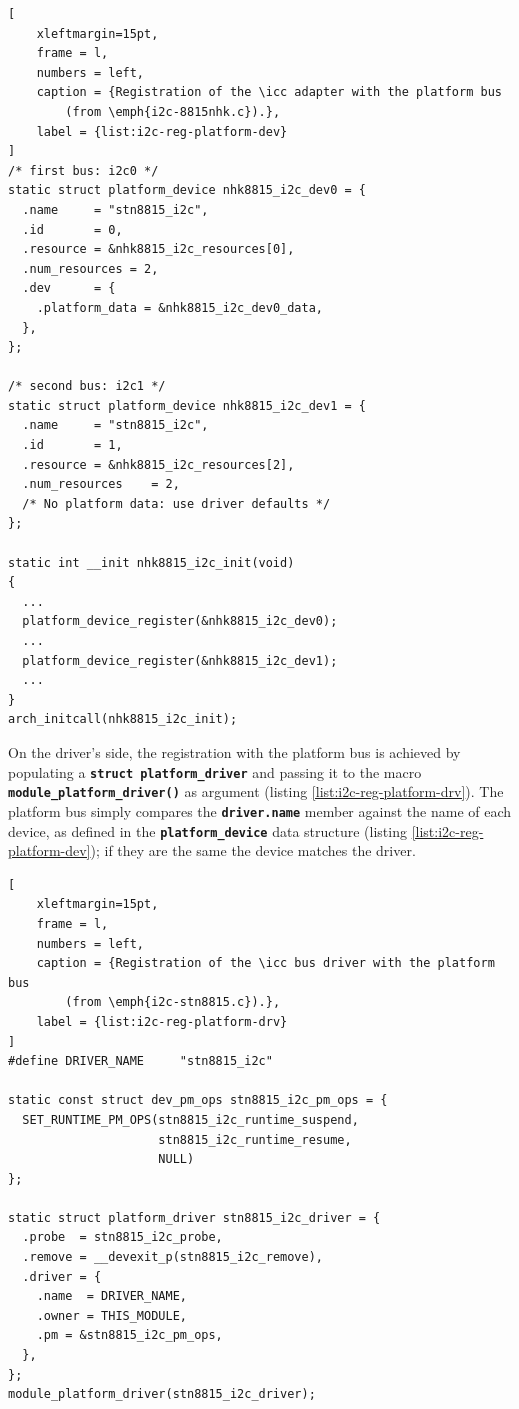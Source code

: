 \documentclass[a4paper,10pt]{article}
\newcommand{\icc}{I\textsuperscript{2}C }
\newcommand{\keyword}[1]{\texttt{\textbf{#1}}}
\begin{document}
\begin{multicols}{2}
\begin{lstlisting}[
	xleftmargin=15pt,
	frame = l,
	numbers = left,
	caption = {Registration of the \icc adapter with the platform bus
		(from \emph{i2c-8815nhk.c}).},
	label = {list:i2c-reg-platform-dev}
]
/* first bus: i2c0 */
static struct platform_device nhk8815_i2c_dev0 = {
  .name		= "stn8815_i2c",
  .id		= 0,
  .resource	= &nhk8815_i2c_resources[0],
  .num_resources = 2,
  .dev		= {
    .platform_data = &nhk8815_i2c_dev0_data,
  },
};

/* second bus: i2c1 */
static struct platform_device nhk8815_i2c_dev1 = {
  .name		= "stn8815_i2c",
  .id		= 1,
  .resource	= &nhk8815_i2c_resources[2],
  .num_resources	= 2,
  /* No platform data: use driver defaults */
};

static int __init nhk8815_i2c_init(void)
{
  ...
  platform_device_register(&nhk8815_i2c_dev0);
  ...
  platform_device_register(&nhk8815_i2c_dev1);
  ...
}
arch_initcall(nhk8815_i2c_init);
\end{lstlisting}

On the driver's side, the registration with the platform bus is achieved by
populating a \keyword{struct  platform\_driver} and passing it to the
macro \keyword{module\_platform\_driver()} as argument (listing
\ref{list:i2c-reg-platform-drv}).
The platform bus simply compares the \keyword{driver.name} member against
the name of each device, as defined in the \keyword{platform\_device} data
structure (listing \ref{list:i2c-reg-platform-dev}); if they are the same
the device matches the driver.

\begin{lstlisting}[
	xleftmargin=15pt,
	frame = l,
	numbers = left,
	caption = {Registration of the \icc bus driver with the platform bus
		(from \emph{i2c-stn8815.c}).},
	label = {list:i2c-reg-platform-drv}
]
#define DRIVER_NAME 	"stn8815_i2c"

static const struct dev_pm_ops stn8815_i2c_pm_ops = {
  SET_RUNTIME_PM_OPS(stn8815_i2c_runtime_suspend,
                     stn8815_i2c_runtime_resume,
                     NULL)
};

static struct platform_driver stn8815_i2c_driver = {
  .probe  = stn8815_i2c_probe,
  .remove = __devexit_p(stn8815_i2c_remove),
  .driver = {
    .name  = DRIVER_NAME,
    .owner = THIS_MODULE,
    .pm	= &stn8815_i2c_pm_ops,
  },
};
module_platform_driver(stn8815_i2c_driver);
\end{lstlisting}


\end{multicols}
\end{document}
